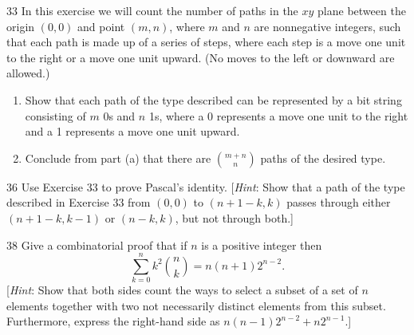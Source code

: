 \documentclass[11pt]{article}
\begin{document}
\begin{exercise}{33}
    In this exercise we will count the number of paths in the $xy$
    plane between the origin $(0,0)$ and point $(m,n)$, where $m$
    and $n$ are nonnegative integers, such that each path is made up
    of a series of steps, where each step is a move one unit to the
    right or a move one unit upward. (No moves to the left or
    downward are allowed.)
    \begin{enumerate}[label=(\alph*)]
        \item Show that each path of the type described can be
        represented by a bit string consisting of $m$ 0s and $n$ 1s,
        where a 0 represents a move one unit to the right and a 1
        represents a move one unit upward.
        \item Conclude from part (a) that there are $\binom{m+n}{n}$
        paths of the desired type.
    \end{enumerate}
\end{exercise}

\begin{exercise}{36}
    Use Exercise 33 to prove Pascal's identity.
    [\emph{Hint}: Show that a path of the type described in Exercise
    33 from $(0,0)$ to $(n+1-k, k)$ passes through either
    $(n+1-k, k-1)$ or $(n-k, k)$, but not through both.]
\end{exercise}

\begin{exercise}{38}
    Give a combinatorial proof that if $n$ is a positive integer then
    \[
    \sum_{k=0}^{n} k^2 \binom{n}{k} = n(n+1)2^{n-2}.
    \]
    [\emph{Hint}: Show that both sides count the ways to select a
    subset of a set of $n$ elements together with two not necessarily
    distinct elements from this subset. Furthermore, express the
    right-hand side as $n(n-1)2^{n-2} + n2^{n-1}$.]
\end{exercise}
\end{document}
